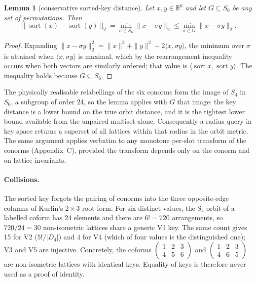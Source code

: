 \documentclass[11pt]{article}
\newtheorem{lemma}{Lemma}[section]
\begin{document}
\begin{lemma}[conservative sorted-key distance]
\label{lem:lb}
Let $x,y\in\mathbb R^6$ and let $G\subseteq S_6$ be any set of permutations. Then
\[
\|\operatorname{sort}(x)-\operatorname{sort}(y)\|_2=\min_{\sigma\in S_6}\|x-\sigma y\|_2\le\min_{\sigma\in G}\|x-\sigma y\|_2 .
\]
\end{lemma}
\begin{proof}
Expanding $\|x-\sigma y\|_2^2=\|x\|^2+\|y\|^2-2\langle x,\sigma y\rangle$, the minimum over $\sigma$ is attained when $\langle x,\sigma y\rangle$ is maximal, which by the rearrangement inequality occurs when both vectors are similarly ordered; that value is $\langle\operatorname{sort}x,\operatorname{sort}y\rangle$. The inequality holds because $G\subseteq S_6$.
\end{proof}

The physically realisable relabellings of the six conorms form the image of $S_4$ in $S_6$, a subgroup of order 24, so the lemma applies with $G$ that image: the key distance is a lower bound on the true orbit distance, and it is the tightest lower bound available from the unpaired multiset alone. Consequently a radius query in key space returns a superset of all lattices within that radius in the orbit metric. The same argument applies verbatim to any monotone per-slot transform of the conorms (Appendix~C), provided the transform depends only on the conorm and on lattice invariants.

\paragraph{Collisions.}
The sorted key forgets the pairing of conorms into the three opposite-edge columns of Kurlin's $2\times3$ root form. For six distinct values, the S$_4$-orbit of a labelled coform has 24 elements and there are $6!=720$ arrangements, so $720/24=30$ non-isometric lattices share a generic V1 key. The same count gives 15 for V2 ($5!/|D_4|$) and 4 for V4 (which of four values is the distinguished one); V3 and V5 are injective. Concretely, the coforms $\begin{pmatrix}1&2&3\\4&5&6\end{pmatrix}$ and $\begin{pmatrix}1&2&3\\4&6&5\end{pmatrix}$ are non-isometric lattices with identical keys. Equality of keys is therefore never used as a proof of identity.
\end{document}
